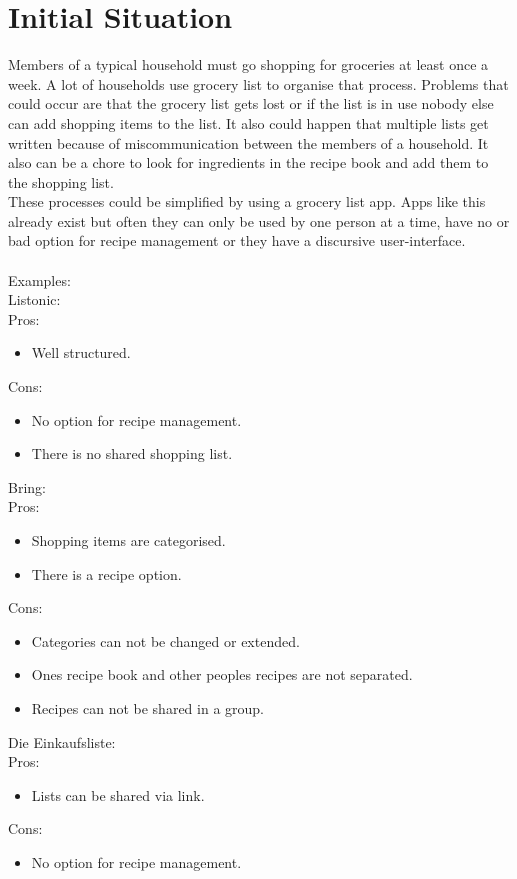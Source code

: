 \documentclass[12pt]{article}
\theoremstyle{definition}
\newenvironment{textblock}{%
   \setlength{\parindent}{0pt}
   \large
   
}{}
\begin{document}
\section{Initial Situation}

\begin{textblock}
Members of a typical household must go shopping for groceries at least once a week. A lot of households use grocery list to organise that process. Problems that could occur are that the grocery list gets lost or if the list is in use nobody else can add shopping items to the list. It also could happen that multiple lists get written because of miscommunication between the members of a household. It also can be a chore to look for ingredients in the recipe book and add them to the shopping list. \\
These processes could be simplified by using a grocery list app. Apps like this already exist but often they can only be used by one person at a time, have no or bad option for recipe management or they have a discursive user-interface.\\ \\
Examples:\\
Listonic:\\
Pros:
\begin{itemize}
\item Well structured.
\end{itemize}
Cons:
\begin{itemize}
\item No option for recipe management.
\item There is no shared shopping list.
\end{itemize}
Bring:\\
Pros:
\begin{itemize}
\item Shopping items are categorised.
\item There is a recipe option.\\
\end{itemize}
Cons:
\begin{itemize}
\item Categories can not be changed or extended.
\item Ones recipe book and other peoples recipes are not separated.
\item Recipes can not be shared in a group.
\end{itemize}
Die Einkaufsliste:\\
Pros:
\begin{itemize}
\item Lists can be shared via link.
\end{itemize}
Cons:
\begin{itemize}
\item No option for recipe management.
\end{itemize}
\end{textblock}
\end{document}
